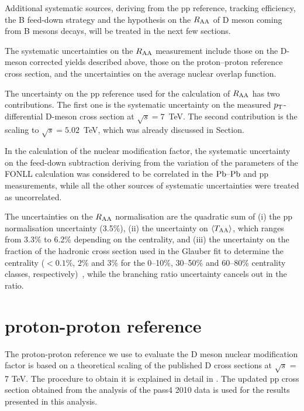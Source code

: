 Additional systematic sources, deriving from the pp reference,
tracking efficiency, the B feed-down strategy and the hypothesis on
the $R_{\rm AA}$ of D meson coming from B mesons decays, will be treated in
the next few sections. 

The systematic uncertainties on the $R_{\rm AA}$ measurement include those 
on the D-meson corrected yields described above, those on the
proton--proton reference cross section, and the uncertainties on the
average nuclear overlap function. 

The uncertainty on the pp reference used for the calculation of $R_{\rm AA}$ 
has two contributions. The first one is the systematic uncertainty on the measured 
$p_{\rm T}$-differential D-meson cross section at $\sqrt s=7$~TeV.
The second contribution is the scaling to 
$\sqrt s = 5.02$~TeV, which was already discussed in Section.

In the calculation of the nuclear modification factor, the systematic 
uncertainty on the feed-down subtraction deriving from
the variation of the parameters of the FONLL calculation was considered to be
correlated in the $\mbox{Pb--Pb}$ and pp measurements, while all the other sources of systematic uncertainties were treated as uncorrelated.

The uncertainties on the $R_{\rm AA}$ normalisation are the quadratic sum of 
(i) the pp normalisation uncertainty  (3.5\%), 
(ii) the uncertainty on $\langle T_{\rm AA} \rangle$, which ranges from 3.3\% to 6.2\% depending on the centrality, and
(iii) the uncertainty on the fraction of the hadronic cross section used in the 
Glauber fit to determine the centrality ($<0.1\%$, $2\%$ and $3\%$ for the 0--10\%, 30--50\% 
and 60--80\% centrality classes, respectively)~\cite{Adam:2015sza}, while the branching ratio uncertainty cancels out in the 
ratio.



\section{proton-proton reference}

The proton-proton reference we use to evaluate the D meson nuclear modification factor is based on a theoretical 
scaling of the published D cross sections at $\sqrt{s}$ = 7 TeV. The procedure to obtain it is 
explained in detail in . The updated pp cross section obtained from the analysis of the pass4 2010 data  is used for the results presented in this analysis.


